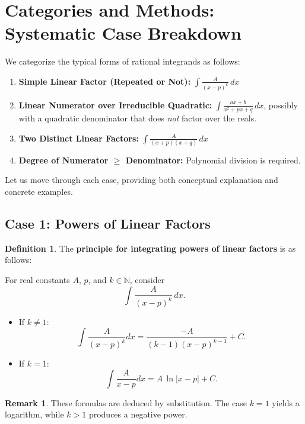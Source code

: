 \documentclass[11pt]{article}
\theoremstyle{definition}
\newtheorem{definition}{Definition}[section]
\newtheorem*{remark}{Remark}
\theoremstyle{plain}
\begin{document}
\section{Categories and Methods: Systematic Case Breakdown}

We categorize the typical forms of rational integrands as follows:

\begin{enumerate}[label=(\roman*)]
    \item \textbf{Simple Linear Factor (Repeated or Not):} \(\displaystyle \int \frac{A}{(x-p)^k} \, dx \)
    \item \textbf{Linear Numerator over Irreducible Quadratic:} \(\displaystyle \int \frac{ax + b}{x^2 + px + q}\, dx \), possibly with a quadratic denominator that does \emph{not} factor over the reals.
    \item \textbf{Two Distinct Linear Factors:} \(\displaystyle \int \frac{A}{(x + p)(x + q)} \, dx \)
    \item \textbf{Degree of Numerator \(\geq\) Denominator:} Polynomial division is required.
\end{enumerate}

Let us move through each case, providing both conceptual explanation and concrete examples.

\subsection{Case 1: Powers of Linear Factors}

\begin{definition}
    The \textbf{principle for integrating powers of linear factors} is as follows:
    
    For real constants \( A \), \( p \), and \( k \in \mathbb{N} \), consider
    \[
        \int \frac{A}{(x-p)^{k}}\, dx.
    \]
    \begin{itemize}
        \item If \( k \neq 1 \):
        \[
            \int \frac{A}{(x-p)^k} dx = \frac{-A}{(k-1)(x-p)^{k-1}} + C.
        \]
        \item If \( k = 1 \):
        \[
            \int \frac{A}{x-p} dx = A\, \ln|x-p| + C.
        \]
    \end{itemize}
\end{definition}
\begin{remark}
    These formulas are deduced by substitution. The case \( k=1 \) yields a logarithm, while \( k>1 \) produces a negative power.
\end{remark}
\end{document}
